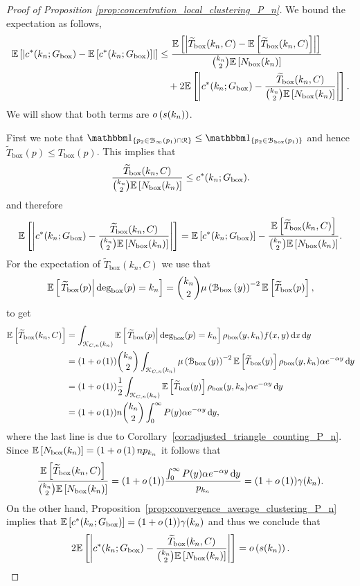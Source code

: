 \begin{proof}[Proof of Proposition \ref{prop:concentration_local_clustering_P_n}]
We bound the expectation as follows,
\begin{align*}
	\mathbb{E}\left[\left|c^\ast(k_n; G_{\text{box}}) - \mathbb{E}\left[c^\ast(k_n; G_{\text{box}})\right]\right|\right] 
	&\le \frac{\mathbb{E}\left[\left|\widetilde{T}_{\text{box}}(k_n,C) - \mathbb{E}\left[\widetilde{T}_{\text{box}}(k_n,C)\right]\right|\right]}
		{\binom{k_n}{2}\mathbb{E}\left[N_{\text{box}}(k_n)\right]}\\
	&\hspace{10pt} + 2 \mathbb{E}\left[\left|c^\ast(k_n; G_{\text{box}}) - \frac{\widetilde{T}_{\text{box}}(k_n,C)}{\binom{k_n}{2}\mathbb{E}\left[N_{\text{box}}(k_n)\right]}\right|\right].
\end{align*}
We will show that both terms are $o\left(s(k_n)\right)$.

First we note that $\ind{p_2 \in \BallPo{p_1} \cap \Rcal} \le \ind{p_2 \in \BallPon{p_1}}$ and hence $\widetilde{T}_{\text{box}}(p) \le T_{\text{box}}(p)$. This implies that
\[
	 \frac{\widetilde{T}_{\text{box}}(k_n,C)}{\binom{k_n}{2}\mathbb{E}\left[N_{\text{box}}(k_n)\right]} \le c^\ast(k_n; G_{\text{box}}). 
\]
and therefore
\[
	\mathbb{E}\left[\left|c^\ast(k_n; G_{\text{box}}) - \frac{\widetilde{T}_{\text{box}}(k_n,C)}{\binom{k_n}{2}\mathbb{E}\left[N_{\text{box}}(k_n)\right]}\right|\right]
	= \mathbb{E}\left[c^\ast(k_n; G_{\text{box}})\right] 
	- \frac{\mathbb{E}\left[\widetilde{T}_{\text{box}}(k_n,C)\right]}{\binom{k_n}{2}\mathbb{E}\left[N_{\text{box}}(k_n)\right]}.
\]
For the expectation of $\widetilde{T}_{\text{box}}(k_n,C)$ we use that 
\[
	\mathbb{E}\left[\left.\widetilde{T}_{\text{box}}(p)\right|\text{deg}_{\text{box}}(p) = k_n\right]
= \binom{k_n}{2} \mu\left({\mathcal B}_{\text{box}}\left(y\right)\right)^{-2} \mathbb{E}\left[\widetilde{T}_{\text{box}}(p)\right],
\] to get
\begin{align*}
	\mathbb{E}\left[\widetilde{T}_{\text{box}}(k_n,C)\right] 
	&= \int_{{\mathcal K}_{C,n}(k_n)} \mathbb{E}\left[\left.\widetilde{T}_{\text{box}}(p)\right|\text{deg}_{\text{box}}(p) = k_n\right]
		\rho_{\text{box}}(y,k_n) f(x,y) \operatorname{\mathrm{d}\hspace{-2pt}} x \operatorname{\mathrm{d}\hspace{-2pt}} y\\
	&= (1+o\left(1\right)) \binom{k_n}{2} \int_{{\mathcal K}_{C,n}(k_n)} \mu\left({\mathcal B}_{\text{box}}\left(y\right)\right)^{-2} \mathbb{E}\left[\widetilde{T}_{\text{box}}(y)\right]
		\rho_{\text{box}}(y,k_n) \alpha e^{-\alpha y} \operatorname{\mathrm{d}\hspace{-2pt}} y\\
	&= (1+o\left(1\right)) \frac{1}{2} \int_{{\mathcal K}_{C,n}(k_n)} \mathbb{E}\left[\widetilde{T}_{\text{box}}(y)\right]
			\rho_{\text{box}}(y,k_n) \alpha e^{-\alpha y} \operatorname{\mathrm{d}\hspace{-2pt}} y\\
	&= (1+o\left(1\right)) n \binom{k_n}{2} \int_0^\infty P(y) \alpha e^{-\alpha y} \operatorname{\mathrm{d}\hspace{-2pt}} y,
\end{align*}
where the last line is due to Corollary~\ref{cor:adjusted_triangle_counting_P_n}. Since $\mathbb{E}\left[N_{\text{box}}(k_n)\right] = (1+o\left(1\right)n p_{k_n}$ it follows that
\[
	\frac{\mathbb{E}\left[\widetilde{T}_{\text{box}}(k_n,C)\right]}{\binom{k_n}{2}\mathbb{E}\left[N_{\text{box}}(k_n)\right]}
	= (1+o\left(1\right)) \frac{\int_0^\infty P(y) \alpha e^{-\alpha y} \operatorname{\mathrm{d}\hspace{-2pt}} y}{p_{k_n}}
	= (1 + o\left(1\right)) \gamma(k_n).
\]
On the other hand, Proposition~\ref{prop:convergence_average_clustering_P_n} implies that $\mathbb{E}\left[c^\ast(k_n; G_{\text{box}})\right] = (1+o\left(1\right))\gamma(k_n)$ and thus we conclude that
\[
	2\mathbb{E}\left[\left|c^\ast(k_n; G_{\text{box}}) - \frac{\widetilde{T}_{\text{box}}(k_n,C)}{\binom{k_n}{2}\mathbb{E}\left[N_{\text{box}}(k_n)\right]}\right|\right]
	= o\left(s(k_n)\right).	
\]


\end{proof}
